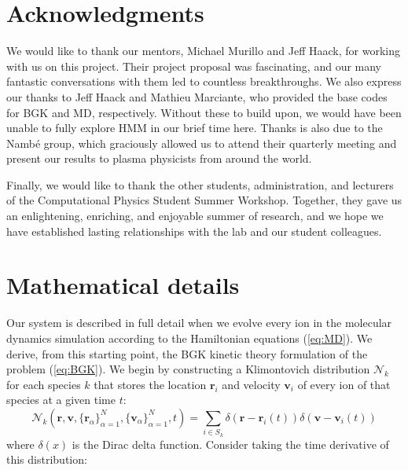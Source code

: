 \documentclass{article}
\begin{document}
\section{Acknowledgments}

We would like to thank our mentors, Michael Murillo and Jeff Haack, for working with us on this project. Their project proposal was fascinating, and our many fantastic conversations with them led to countless breakthroughs. We also express our thanks to Jeff Haack and Mathieu Marciante, who provided the base codes for BGK and MD, respectively. Without these to build upon, we would have been unable to fully explore HMM in our brief time here. Thanks is also due to the Namb\'e group, which graciously allowed us to attend their quarterly meeting and present our results to plasma physicists from around the world.

Finally, we would like to thank the other students, administration, and lecturers of the Computational Physics Student Summer Workshop. Together, they gave us an enlightening, enriching, and enjoyable summer of research, and we hope we have established lasting relationships with the lab and our student colleagues.

\newpage
\appendix


\section{Mathematical details}



Our system is described in full detail when we evolve every ion in the molecular dynamics simulation according to the Hamiltonian equations (\ref{eq:MD}). We derive, from this starting point, the BGK kinetic theory formulation of the problem (\ref{eq:BGK}). We begin by constructing a Klimontovich distribution \cite{klimontovich1983kinetic} $\mathcal{N}_k$ for each species $k$ that stores the location $\mathbf{r}_i$ and velocity $\mathbf{v}_i$ of every ion of that species at a given time $t$:
\begin{equation}\mathcal{N}_k(\mathbf{r},\mathbf{v},\{\mathbf{r}_\alpha\}_{\alpha=1}^{N},\{\mathbf{v}_\alpha\}_{\alpha=1}^{N},t)=\sum_{i\in S_k}\delta\left(\mathbf{r}-\mathbf{r}_i(t)\right)\delta\left(\mathbf{v}-\mathbf{v}_i(t)\right)
\end{equation}where $\delta(x)$ is the Dirac delta function. Consider taking the time derivative of this distribution:
\end{document}
